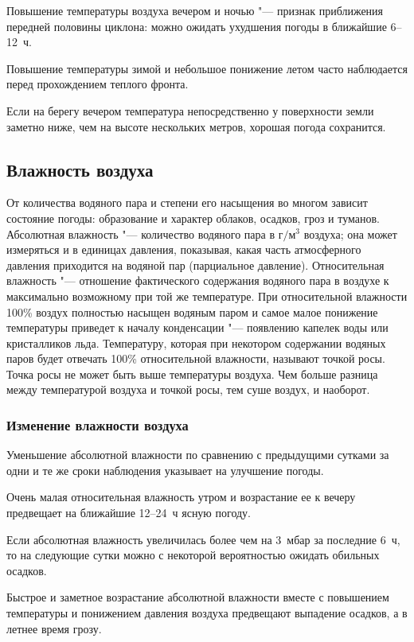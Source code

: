  Повышение температуры воздуха вечером и ночью "--- признак
приближения передней половины циклона: можно ожидать ухудшения погоды
в ближайшие 6--12~ч.

 Повышение температуры зимой и небольшое понижение летом часто
наблюдается перед прохождением теплого фронта.

 Если на берегу вечером температура непосредственно у
поверхности земли заметно ниже, чем на высоте нескольких метров,
хорошая погода сохранится.

\subsection{Влажность воздуха}

От количества водяного пара и степени его насыщения во многом зависит
состояние погоды: образование и характер облаков, осадков, гроз и
туманов. Абсолютная влажность "--- количество водяного пара в г$/$м$^3$
воздуха; она может измеряться и в единицах давления, показывая, какая
часть атмосферного давления приходится на водяной пар (парциальное
давление). Относительная влажность "--- отношение фактического содержания
водяного пара в воздухе к максимально возможному при той же
температуре. При относительной влажности 100\% воздух полностью
насыщен водяным паром и самое малое понижение температуры приведет к
началу конденсации "--- появлению капелек воды или кристалликов
льда. Температуру, которая при некотором содержании водяных паров
будет отвечать 100\% относительной влажности, называют точкой
росы. Точка росы не может быть выше температуры воздуха. Чем больше
разница между температурой воздуха и точкой росы, тем суше воздух, и
наоборот.

\subsubsection{Изменение влажности воздуха}

 Уменьшение абсолютной влажности по сравнению с предыдущими
сутками за одни и те же сроки наблюдения указывает на улучшение
погоды.

 Очень малая относительная влажность утром и возрастание ее к
вечеру предвещает на ближайшие 12--24~ч ясную погоду.

 Если абсолютная влажность увеличилась более чем на 3~мбар за
последние 6~ч, то на следующие сутки можно с некоторой вероятностью
ожидать обильных осадков.

 Быстрое и заметное возрастание абсолютной влажности вместе с
повышением температуры и понижением давления воздуха предвещают
выпадение осадков, а в летнее время грозу.

